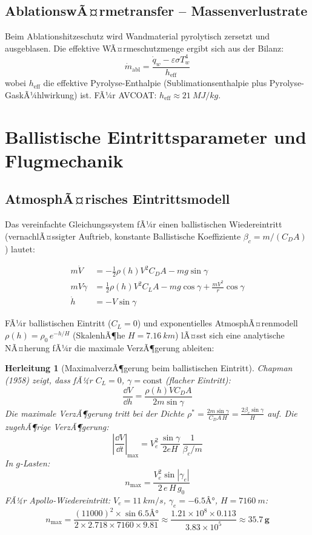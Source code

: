 ﻿\documentclass[12pt,a4paper]{article}
\newtheorem{herleitung}{Herleitung}[section]
\begin{document}
\subsection{AblationswÃ¤rmetransfer -- Massenverlustrate}

Beim Ablationshitzeschutz wird Wandmaterial pyrolytisch zersetzt und ausgeblasen.
Die effektive WÃ¤rmeschutzmenge ergibt sich aus der Bilanz:
\[
  \dot{m}_{\mathrm{abl}} = \frac{\dot{q}_w - \varepsilon\sigma T_w^4}{h_{\mathrm{eff}}}
\]
wobei $h_{\mathrm{eff}}$ die effektive Pyrolyse-Enthalpie (Sublimationsenthalpie plus
Pyrolyse-GaskÃ¼hl\-wirkung) ist. FÃ¼r AVCOAT: $h_{\mathrm{eff}} \approx \SI{21}{MJ/kg}$.

\section{Ballistische Eintrittsparameter und Flugmechanik}

\subsection{AtmosphÃ¤risches Eintrittsmodell}

Das vereinfachte Gleichungssystem fÃ¼r einen ballistischen Wiedereintritt
(vernachlÃ¤ssigter Auftrieb, konstante Ballistische Koeffiziente
$\beta_c = m/(C_D A)$) lautet:

\begin{align}
  m\dot{V} &= -\frac{1}{2}\rho(h) V^2 C_D A - mg\sin\gamma
  \label{eq:flugbahn1}\\
  mV\dot{\gamma} &= \frac{1}{2}\rho(h) V^2 C_L A - mg\cos\gamma
    + \frac{mV^2}{r}\cos\gamma
  \label{eq:flugbahn2}\\
  \dot{h} &= -V\sin\gamma
  \label{eq:flugbahn3}
\end{align}

FÃ¼r ballistischen Eintritt ($C_L = 0$) und exponentielles AtmosphÃ¤renmodell
$\rho(h) = \rho_0\,e^{-h/H}$ (SkalenhÃ¶he $H = \SI{7.16}{km}$) lÃ¤sst sich eine
analytische NÃ¤herung fÃ¼r die maximale VerzÃ¶gerung ableiten:

\begin{herleitung}[MaximalverzÃ¶gerung beim ballistischen Eintritt]
Chapman (1958) zeigt, dass fÃ¼r $C_L=0$, $\gamma = \text{const}$ (flacher Eintritt):
\[
  \frac{\dd V}{\dd h} = \frac{\rho(h) V C_D A}{2m\sin\gamma}
\]
Die maximale VerzÃ¶gerung tritt bei der Dichte
$\rho^* = \frac{2m\sin\gamma}{C_D A\,H} = \frac{2\beta_c\sin\gamma}{H}$
auf. Die zugehÃ¶rige VerzÃ¶gerung:
\[
  \left|\frac{\dd V}{\dd t}\right|_{\max} = V_e^2\,\frac{\sin\gamma}{2eH}\,\frac{1}{\beta_c/m}
\]
In $g$-Lasten:
\[
  \boxed{n_{\max} = \frac{V_e^2\sin|\gamma_e|}{2\,e\,H\,g_0}}
\]
FÃ¼r Apollo-Wiedereintritt: $V_e = \SI{11}{km/s}$, $\gamma_e = -6.5Â°$, $H = \SI{7160}{m}$:
\[
  n_{\max} = \frac{(11000)^2 \times \sin 6.5Â°}{2\times 2.718\times 7160\times 9.81}
  \approx \frac{1.21\times 10^8\times 0.113}{3.83\times 10^5}
  \approx \mathbf{35.7\,g}
\]
\end{herleitung}
\end{document}

